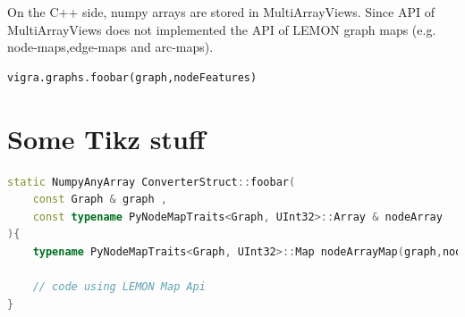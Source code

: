 On the C++ side, numpy arrays are stored in MultiArrayViews.
Since API of MultiArrayViews \cite{software_vigra_multiarray_api} does
not implemented the API  of LEMON graph maps (e.g. node-maps,edge-maps and arc-maps).
 

\begin{lstlisting}[language=python]
vigra.graphs.foobar(graph,nodeFeatures)
\end{lstlisting}
\section{Some Tikz stuff}




\begin{lstlisting}[language=c++]
static NumpyAnyArray ConverterStruct::foobar(
    const Graph & graph , 
    const typename PyNodeMapTraits<Graph, UInt32>::Array & nodeArray
){
    typename PyNodeMapTraits<Graph, UInt32>::Map nodeArrayMap(graph,nodeArray)

    // code using LEMON Map Api 
}
\end{lstlisting}
